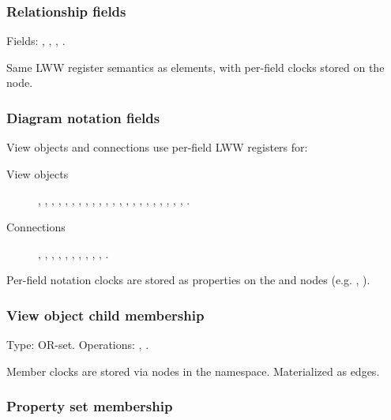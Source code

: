 \subsubsection{Relationship fields}

Fields: , , ,
.

Same LWW register semantics as elements, with per-field clocks stored on the
 node.

\subsubsection{Diagram notation fields}

View objects and connections use per-field LWW registers for:

\begin{description}
\item[View objects] , , , ,
  , , , ,
  , , ,
  , ,
  , , ,
  , , ,
  , , ,
  .
\item[Connections] , ,
  , , ,
  , , , ,
  , .
\end{description}

Per-field notation clocks are stored as properties on the
 and  nodes (e.g.
, ).

\subsubsection{View object child membership}

Type: OR-set. Operations: ,
.

Member clocks are stored via  nodes in the
 namespace. Materialized as
 edges.

\subsubsection{Property set membership}

